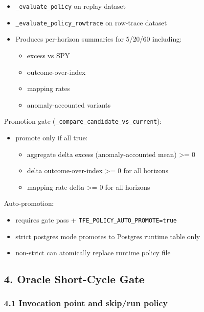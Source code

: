\documentclass[
]{article}
\providecommand{\tightlist}{%
  \setlength{\itemsep}{0pt}\setlength{\parskip}{0pt}}
\begin{document}
\begin{itemize}
\tightlist
\item
  \texttt{\_evaluate\_policy} on replay dataset
\item
  \texttt{\_evaluate\_policy\_rowtrace} on row-trace dataset
\item
  Produces per-horizon summaries for 5/20/60 including:

  \begin{itemize}
  \tightlist
  \item
    excess vs SPY
  \item
    outcome-over-index
  \item
    mapping rates
  \item
    anomaly-accounted variants
  \end{itemize}
\end{itemize}

Promotion gate (\texttt{\_compare\_candidate\_vs\_current}):

\begin{itemize}
\tightlist
\item
  promote only if all true:

  \begin{itemize}
  \tightlist
  \item
    aggregate delta excess (anomaly-accounted mean) \textgreater= 0
  \item
    delta outcome-over-index \textgreater= 0 for all horizons
  \item
    mapping rate delta \textgreater= 0 for all horizons
  \end{itemize}
\end{itemize}

Auto-promotion:

\begin{itemize}
\tightlist
\item
  requires gate pass + \texttt{TFE\_POLICY\_AUTO\_PROMOTE=true}
\item
  strict postgres mode promotes to Postgres runtime table only
\item
  non-strict can atomically replace runtime policy file
\end{itemize}

\subsection{4. Oracle Short-Cycle Gate}\label{4-oracle-short-cycle-gate}

\subsubsection{4.1 Invocation point and skip/run
policy}\label{41-invocation-point-and-skiprun-policy}
\end{document}
